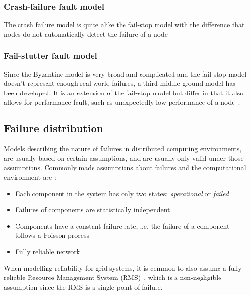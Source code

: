 \documentclass{cslthse-msc}
\begin{document}
\subsubsection{Crash-failure fault model}
The crash failure model is quite alike the fail-stop model with the difference that nodes do not automatically detect the failure of a node~\cite{faultTolerantFundamentals, adaptiveAgentReplication}.

\subsubsection{Fail-stutter fault model}
Since the Byzantine model is very broad and complicated and the fail-stop model doesn't represent enough real-world failures, a third middle ground model has been developed. It is an extension of the fail-stop model but differ in that it also allows for performance fault, such as unexpectedly low performance of a node~\cite{surveyFaultParallel}.

\subsection{Failure distribution} \label{subsec:background_failure_distribution}
Models describing the nature of failures in distributed computing environments, are usually based on certain assumptions, and are usually only valid under those assumptions. Commonly made assumptions about failures and the computational environment are \cite{relModelDistSimSystem, relModelAnalysis, cloudServiceRel, studyServiceRel, hierarchicalRelModeling, selfAdaptRel}:
\begin{itemize}
	\item Each component in the system has only two states: \emph{operational} or \emph{failed}
	\item Failures of components are statistically independent
	\item Components have a constant failure rate, i.e. the failure of a component follows a Poisson process
	\item Fully reliable network
\end{itemize}

When modelling reliability for grid systems, it is common to also assume a fully reliable Resource Management System (RMS)~\cite{relAndPerfGridServices, relGridServicePredConstraint}, which is a non-negligible assumption since the RMS is a single point of failure.
\end{document}
